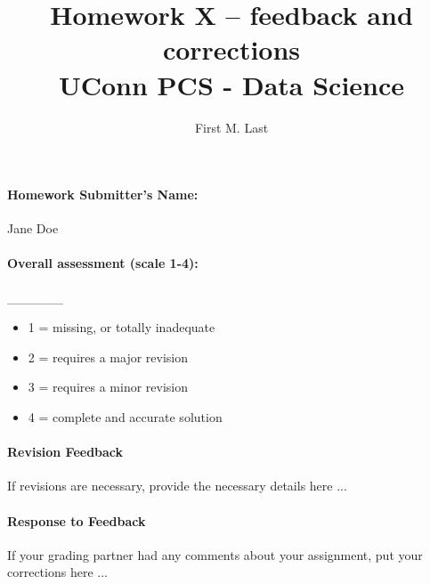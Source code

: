 \documentclass[12pt]{article}
\title{Homework X -- feedback and corrections\\
   UConn PCS - Data Science}
\date{} %
\author{First M. Last}
\begin{document}
\maketitle

\paragraph{Homework Submitter's Name:} Jane Doe

\paragraph{Overall assessment (scale 1-4):} \_\_\_\_\_\_

\begin{itemize}
\item
  1 = missing, or totally inadequate
\item
  2 = requires a major revision
\item
  3 = requires a minor revision
\item
  4 = complete and accurate solution
\end{itemize}

\paragraph{Revision Feedback}
If revisions are necessary, provide the necessary details here ...

\vfill

\paragraph{Response to Feedback}
If your grading partner had any comments about your assignment, put your
corrections here ...

\vfill
\end{document}
